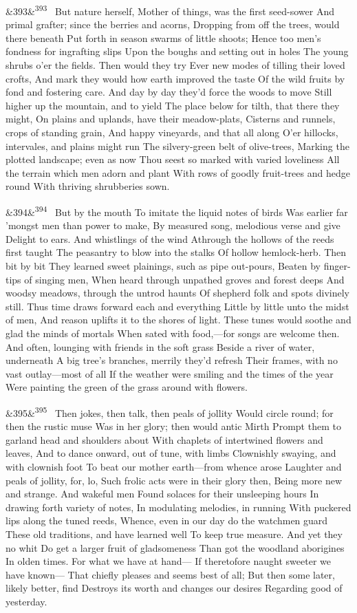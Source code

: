 \documentclass[12pt]{article}
\newcommand{\para}[1][]{\par\noindent\ifx&#1&\else\textsuperscript{\footnotesize #1}~\fi}
\begin{document}
\para[393] But nature herself, Mother of things, was the first seed-sower And primal grafter; since the berries and acorns, Dropping from off the trees, would there beneath Put forth in season swarms of little shoots; Hence too men's fondness for ingrafting slips Upon the boughs and setting out in holes The young shrubs o'er the fields. Then would they try Ever new modes of tilling their loved crofts, And mark they would how earth improved the taste Of the wild fruits by fond and fostering care. And day by day they'd force the woods to move Still higher up the mountain, and to yield The place below for tilth, that there they might, On plains and uplands, have their meadow-plats, Cisterns and runnels, crops of standing grain, And happy vineyards, and that all along O'er hillocks, intervales, and plains might run The silvery-green belt of olive-trees, Marking the plotted landscape; even as now Thou seest so marked with varied loveliness All the terrain which men adorn and plant With rows of goodly fruit-trees and hedge round With thriving shrubberies sown.

\para[394] But by the mouth To imitate the liquid notes of birds Was earlier far 'mongst men than power to make, By measured song, melodious verse and give Delight to ears. And whistlings of the wind Athrough the hollows of the reeds first taught The peasantry to blow into the stalks Of hollow hemlock-herb. Then bit by bit They learned sweet plainings, such as pipe out-pours, Beaten by finger-tips of singing men, When heard through unpathed groves and forest deeps And woodsy meadows, through the untrod haunts Of shepherd folk and spots divinely still. Thus time draws forward each and everything Little by little unto the midst of men, And reason uplifts it to the shores of light. These tunes would soothe and glad the minds of mortals When sated with food,---for songs are welcome then. And often, lounging with friends in the soft grass Beside a river of water, underneath A big tree's branches, merrily they'd refresh Their frames, with no vast outlay---most of all If the weather were smiling and the times of the year Were painting the green of the grass around with flowers.

\para[395] Then jokes, then talk, then peals of jollity Would circle round; for then the rustic muse Was in her glory; then would antic Mirth Prompt them to garland head and shoulders about With chaplets of intertwined flowers and leaves, And to dance onward, out of tune, with limbs Clownishly swaying, and with clownish foot To beat our mother earth---from whence arose Laughter and peals of jollity, for, lo, Such frolic acts were in their glory then, Being more new and strange. And wakeful men Found solaces for their unsleeping hours In drawing forth variety of notes, In modulating melodies, in running With puckered lips along the tuned reeds, Whence, even in our day do the watchmen guard These old traditions, and have learned well To keep true measure. And yet they no whit Do get a larger fruit of gladsomeness Than got the woodland aborigines In olden times. For what we have at hand--- If theretofore naught sweeter we have known--- That chiefly pleases and seems best of all; But then some later, likely better, find Destroys its worth and changes our desires Regarding good of yesterday.
\end{document}
